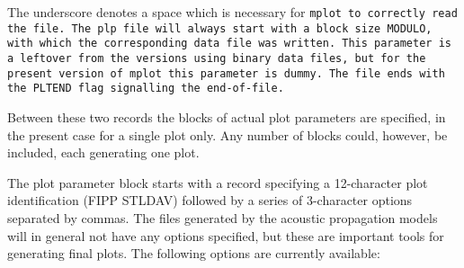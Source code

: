 The underscore denotes a space which is necessary for \tt mplot \rm to correctly read
the file. The \tt plp \rm file will always start with a block size MODULO, with which
the corresponding data file was written. This parameter is a leftover from
the versions using binary data files, but for the present version of
\tt mplot \rm
this parameter is dummy. The file ends with the \tt PLTEND \rm flag 
signalling the end-of-file.

Between these two records the blocks of actual plot parameters are specified, 
in the present case for a single plot only. Any number of blocks could, 
however, be included, each generating one plot.

The plot parameter block starts with a record specifying a 12-character plot
identification (FIPP  STLDAV) followed by a series of 3-character options
separated by commas. The files generated by the acoustic propagation
models
 will in general
not have any options specified, but these are important tools for generating
final plots. The following options are currently available:

